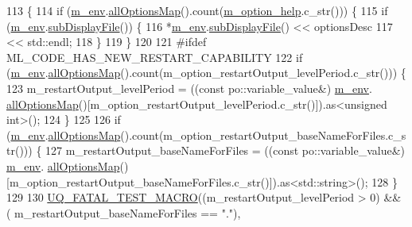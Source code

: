 \begin{DoxyCode}
113 \{
114   \textcolor{keywordflow}{if} (\hyperlink{class_q_u_e_s_o_1_1_m_l_sampling_options_a28d73f222e9b20f1c749ed808f69eebd}{m\_env}.\hyperlink{class_q_u_e_s_o_1_1_base_environment_ae7cee155956e0e70112f45e2ad1f02c8}{allOptionsMap}().count(\hyperlink{class_q_u_e_s_o_1_1_m_l_sampling_options_a5239a6e156de70d1f64b90e5885556d5}{m\_option\_help}.c\_str())) \{
115     \textcolor{keywordflow}{if} (\hyperlink{class_q_u_e_s_o_1_1_m_l_sampling_options_a28d73f222e9b20f1c749ed808f69eebd}{m\_env}.\hyperlink{class_q_u_e_s_o_1_1_base_environment_a8a0064746ae8dddfece4229b9ad374d6}{subDisplayFile}()) \{
116       *\hyperlink{class_q_u_e_s_o_1_1_m_l_sampling_options_a28d73f222e9b20f1c749ed808f69eebd}{m\_env}.\hyperlink{class_q_u_e_s_o_1_1_base_environment_a8a0064746ae8dddfece4229b9ad374d6}{subDisplayFile}() << optionsDesc
117                               << std::endl;
118     \}
119   \}
120 
121 \textcolor{preprocessor}{#ifdef ML\_CODE\_HAS\_NEW\_RESTART\_CAPABILITY}
122 \textcolor{preprocessor}{}  \textcolor{keywordflow}{if} (\hyperlink{class_q_u_e_s_o_1_1_m_l_sampling_options_a28d73f222e9b20f1c749ed808f69eebd}{m\_env}.\hyperlink{class_q_u_e_s_o_1_1_base_environment_ae7cee155956e0e70112f45e2ad1f02c8}{allOptionsMap}().count(m\_option\_restartOutput\_levelPeriod.c\_str())) \{
123     m\_restartOutput\_levelPeriod = ((\textcolor{keyword}{const} po::variable\_value&) \hyperlink{class_q_u_e_s_o_1_1_m_l_sampling_options_a28d73f222e9b20f1c749ed808f69eebd}{m\_env}.
      \hyperlink{class_q_u_e_s_o_1_1_base_environment_ae7cee155956e0e70112f45e2ad1f02c8}{allOptionsMap}()[m\_option\_restartOutput\_levelPeriod.c\_str()]).as<unsigned int>();
124   \}
125 
126   \textcolor{keywordflow}{if} (\hyperlink{class_q_u_e_s_o_1_1_m_l_sampling_options_a28d73f222e9b20f1c749ed808f69eebd}{m\_env}.\hyperlink{class_q_u_e_s_o_1_1_base_environment_ae7cee155956e0e70112f45e2ad1f02c8}{allOptionsMap}().count(m\_option\_restartOutput\_baseNameForFiles.c\_str())) \{
127     m\_restartOutput\_baseNameForFiles = ((\textcolor{keyword}{const} po::variable\_value&) \hyperlink{class_q_u_e_s_o_1_1_m_l_sampling_options_a28d73f222e9b20f1c749ed808f69eebd}{m\_env}.
      \hyperlink{class_q_u_e_s_o_1_1_base_environment_ae7cee155956e0e70112f45e2ad1f02c8}{allOptionsMap}()[m\_option\_restartOutput\_baseNameForFiles.c\_str()]).as<std::string>();
128   \}
129 
130   \hyperlink{_defines_8h_a56d63d18d0a6d45757de47fcc06f574d}{UQ\_FATAL\_TEST\_MACRO}((m\_restartOutput\_levelPeriod > 0) && (
      m\_restartOutput\_baseNameForFiles == \textcolor{stringliteral}{"."}),

\end{DoxyCode}
